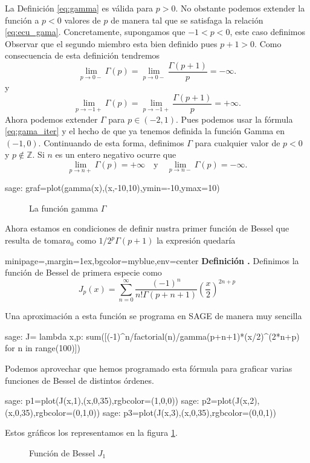 \documentclass{article}
\newenvironment{colbox}[2]{%
    \begin{adjustbox}{minipage={\linewidth},margin=1ex,bgcolor=#1,env=center}
        #2}{%
    \end{adjustbox}%
}
\newcounter{defi_cont}
\newenvironment{definicion}[1]{\begin{colbox}{myblue}{\refstepcounter{defi_cont}\textbf{Definición \arabic{defi_cont}.} #1}}{\end{colbox}}
\begin{document}
La Definición \ref{eq:gamma} es válida para $p>0$. No obstante podemos extender la función a $p<0$ valores de $p$ de manera tal que se satisfaga la relación \eqref{eq:ecu_gama}. Concretamente,  supongamos  que $-1<p<0$,  este caso definimos
Observar que el segundo miembro esta bien definido pues $p+1>0$. Como consecuencia de esta definición tendremos
\[\lim_{p\to 0-}\Gamma(p)=\lim_{p\to 0-}\frac{\Gamma(p+1)}{p}=-\infty.\]
y 
\[\lim_{p\to -1+}\Gamma(p)=\lim_{p\to -1+}\frac{\Gamma(p+1)}{p}=+\infty.\] 
Ahora podemos extender $\Gamma$ para $p\in (-2,1)$. Pues  podemos usar la fórmula \eqref{eq:gama_iter} y el hecho de que ya tenemos definida la función Gamma en $(-1,0)$. Continuando de esta forma, definimos $\Gamma$ para cualquier valor de $p<0$ y $p\notin \mathbb{Z}$. Si $n$ es un entero negativo ocurre que
\[\lim_{p\to n+}\Gamma(p)=+\infty\quad\text{y}\quad \lim_{p\to n-}\Gamma(p)=-\infty.\] 

\begin{sagecommandline}
 sage: graf=plot(gamma(x),(x,-10,10),ymin=-10,ymax=10)
\end{sagecommandline}

\begin{figure}[h]
\caption{La función gamma $\Gamma$}
\end{figure}
Ahora estamos en condiciones de definir nustra primer función de Bessel que resulta de tomar$a_0$ como $1/2^p\Gamma(p+1)$ la expresión quedaría

\begin{definicion} Definimos la función de Bessel de primera especie como
\[J_p(x)=\sum_{n=0}^{\infty}\frac{(-1)^n}{n!\Gamma(p+n+1)}\left(\frac{x}{2}\right)^{2n+p}\]
\end{definicion}


Una aproximación a esta función se programa en SAGE de manera muy sencilla
\begin{sagecommandline}
sage: J= lambda x,p: sum([(-1)^n/factorial(n)/gamma(p+n+1)*(x/2)^(2*n+p) for n in range(100)])
\end{sagecommandline}
Podemos aprovechar que hemos programado esta fórmula para graficar varias funciones de Bessel de distintos órdenes.
\begin{sagecommandline}
sage: p1=plot(J(x,1),(x,0,35),rgbcolor=(1,0,0))
sage: p2=plot(J(x,2),(x,0,35),rgbcolor=(0,1,0))
sage: p3=plot(J(x,3),(x,0,35),rgbcolor=(0,0,1))
\end{sagecommandline}
Estos gráficos los representamos en la figura \ref{fig:bessel}.
\begin{center}
\begin{figure}[h]
\caption{Función de Bessel $J_1$}\label{fig:bessel}
\end{figure}
\end{center}
\end{document}
